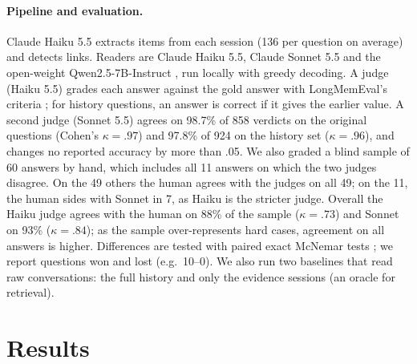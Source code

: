 \documentclass[11pt]{article}
\begin{document}
\paragraph{Pipeline and evaluation.} Claude Haiku 5.5 extracts items from each session (136 per
question on average) and detects links. Readers are Claude Haiku 5.5, Claude Sonnet 5.5 and the
open-weight Qwen2.5-7B-Instruct \citep{qwen2025qwen25}, run locally with greedy decoding. A judge
(Haiku 5.5) grades each answer against the gold answer with LongMemEval's criteria
\citep[cf.][]{zheng2023judging}; for history questions, an answer is correct if it gives the earlier
value. A second judge (Sonnet 5.5) agrees on 98.7\% of 858 verdicts on the original questions
(Cohen's $\kappa=.97$) and 97.8\% of 924 on the history set ($\kappa=.96$), and changes no reported
accuracy by more than .05. We also graded a blind sample of 60 answers by hand, which includes all 11
answers on which the two judges disagree. On the 49 others the human agrees with the judges on all 49;
on the 11, the human sides with Sonnet in 7, as Haiku is the stricter judge. Overall the Haiku judge
agrees with the human on 88\% of the sample ($\kappa=.73$) and Sonnet on 93\% ($\kappa=.84$); as the
sample over-represents hard cases, agreement on all answers is higher.
Differences are tested with paired exact McNemar tests \citep{mcnemar1947}; we report questions won
and lost (e.g.\ 10--0). We also run two baselines that read raw conversations: the full history and
only the evidence sessions (an oracle for retrieval).

\section{Results}
\label{sec:results}
\end{document}
